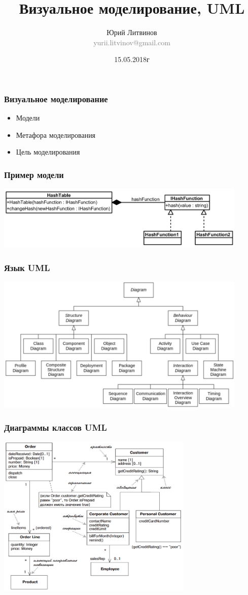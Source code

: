 \documentclass[xetex,mathserif,serif]{beamer}
\title{Визуальное моделирование, UML}
\author[Юрий Литвинов]{Юрий Литвинов\\\small{\textcolor{gray}{yurii.litvinov@gmail.com}}}
\date{15.05.2018г}
\begin{document}
	\frame{\titlepage}

	\begin{frame}
		\frametitle{Визуальное моделирование}
		\begin{itemize}
			\item Модели
			\item Метафора моделирования
			\item Цель моделирования
		\end{itemize}
	\end{frame}

	\begin{frame}
		\frametitle{Пример модели}
		\begin{center}
			\includegraphics[width=0.9\textwidth]{modelExample.png}
		\end{center}
	\end{frame}

	\begin{frame}
		\frametitle{Язык UML}
		\begin{center}
			\includegraphics[width=0.9\textwidth]{umlDiagrams.png}
		\end{center}
	\end{frame}

	\begin{frame}
		\frametitle{Диаграммы классов UML}
		\begin{center}
			\includegraphics[width=0.7\textwidth]{umlClassDiagram.png}
		\end{center}
	\end{frame}
\end{document}
